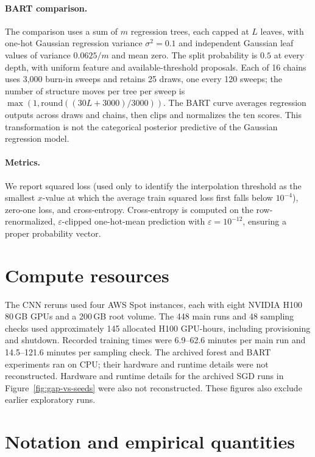 \paragraph{BART comparison.}
The comparison uses a sum of $m$ regression trees, each capped at $L$
leaves, with one-hot Gaussian regression variance $\sigma^2=0.1$ and
independent Gaussian leaf values of variance $0.0625/m$ and mean zero.
The split probability is $0.5$ at every depth, with uniform feature and
available-threshold proposals. Each of 16 chains uses 3,000 burn-in
sweeps and retains 25 draws, one every 120 sweeps; the number of structure
moves per tree per sweep is
$\max(1,\mathrm{round}((30L+3000)/3000))$.
The BART curve averages regression outputs across draws and chains, then
clips and normalizes the ten scores. This transformation is not the
categorical posterior predictive of the Gaussian regression model.

\paragraph{Metrics.}
We report squared loss (used only to identify the interpolation
threshold as the smallest $x$-value at which the average train squared
loss first falls below $10^{-4}$), zero-one loss, and cross-entropy.
Cross-entropy is computed on the row-renormalized, $\varepsilon$-clipped
one-hot-mean prediction with $\varepsilon = 10^{-12}$, ensuring a proper
probability vector.

\section{Compute resources}
\label{app:compute}

The CNN reruns used four AWS Spot instances, each with eight NVIDIA H100
80\,GB GPUs and a 200\,GB root volume. The 448 main runs and 48 sampling
checks used approximately 145 allocated H100 GPU-hours, including
provisioning and shutdown. Recorded training times were 6.9--62.6 minutes
per main run and 14.5--121.6 minutes per sampling check.
The archived forest and BART experiments ran on CPU; their hardware and
runtime details were not reconstructed. Hardware and runtime details for
the archived SGD runs in Figure~\ref{fig:gap-vs-seeds} were also not
reconstructed. These figures also exclude earlier exploratory runs.

\section{Notation and empirical quantities}
\label{app:interpretation}

